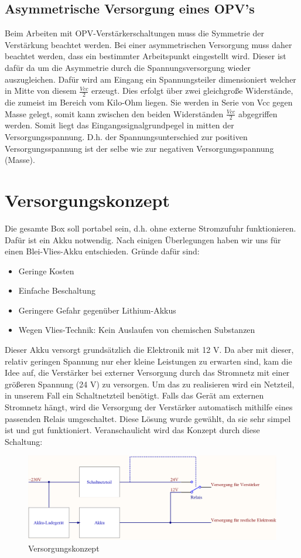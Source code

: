 \subsection{Asymmetrische Versorgung eines OPV's}\label{subsec:3.5.1}
Beim Arbeiten mit OPV-Verstärkerschaltungen muss die Symmetrie der Verstärkung beachtet werden.
Bei einer asymmetrischen Versorgung muss daher beachtet werden, dass ein bestimmter Arbeitspunkt eingestellt wird.
Dieser ist dafür da um die Asymmetrie durch die Spannungsversorgung wieder auszugleichen.
Dafür wird am Eingang ein Spannungsteiler dimensioniert welcher in Mitte von diesem $\frac{Vcc}{2}$ erzeugt.
Dies erfolgt über zwei gleichgroße Widerstände, die zumeist im Bereich vom Kilo-Ohm liegen.
Sie werden in Serie von Vcc gegen Masse gelegt, somit kann zwischen den beiden Widerständen $\frac{Vcc}{2}$ abgegriffen werden.
Somit liegt das Eingangssignalgrundpegel in mitten der Versorgungsspannung.
D.h. der Spannungsunterschied zur positiven Versorgungsspannung ist der selbe wie zur negativen Versorgungsspannung (Masse). 

\newpage
\section{Versorgungskonzept} \label{sec:3.6}
Die gesamte Box soll portabel sein, d.h. ohne externe Stromzufuhr funktionieren.
Dafür ist ein Akku notwendig.
Nach einigen Überlegungen haben wir uns für einen Blei-Vlies-Akku entschieden.
Gründe dafür sind:
\begin{itemize}
	\item Geringe Kosten
	\item Einfache Beschaltung
	\item Geringere Gefahr gegenüber Lithium-Akkus
	\item Wegen Vlies-Technik: Kein Auslaufen von chemischen Substanzen
\end{itemize}
Dieser Akku versorgt grundsätzlich die Elektronik mit 12 V.
Da aber mit dieser, relativ geringen Spannung nur eher kleine Leistungen zu erwarten sind, kam die Idee auf, die Verstärker bei externer Versorgung durch das Stromnetz mit einer größeren Spannung (24 V) zu versorgen.
Um das zu realisieren wird ein Netzteil, in unserem Fall ein Schaltnetzteil benötigt.
Falls das Gerät am externen Stromnetz hängt, wird die Versorgung der Verstärker automatisch mithilfe eines passenden Relais umgeschaltet.
Diese Lösung wurde gewählt, da sie sehr simpel ist und gut funktioniert.
Veranschaulicht wird das Konzept durch diese Schaltung:
\begin{figure} [H]
	\centering	
	\includegraphics[width=1\textwidth]{img/Grundlagen/Versorgung.png}
	\caption{Versorgungskonzept}
	\label {fig:3.6.1}
\end{figure}

